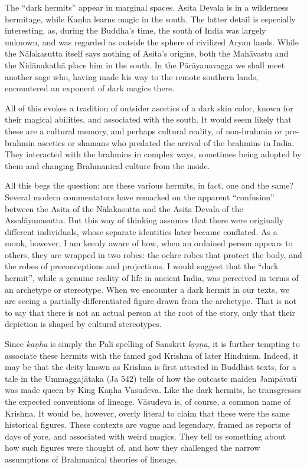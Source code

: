\documentclass[12pt,openany]{book}%
\begin{document}
The “dark hermits” appear in marginal spaces. Asita Devala is in a wilderness hermitage, while \textsanskrit{Kaṇha} learns magic in the south. The latter detail is especially interesting, as, during the Buddha’s time, the south of India was largely unknown, and was regarded as outside the sphere of civilized Aryan lands. While the \textsanskrit{Nālakasutta} itself says nothing of Asita’s origins, both the \textsanskrit{Mahāvastu} and the \textsanskrit{Nidānakathā} place him in the south. In the \textsanskrit{Pārāyanavagga} we shall meet another sage who, having made his way to the remote southern lands, encountered an exponent of dark magics there.

All of this evokes a tradition of outsider ascetics of a dark skin color, known for their magical abilities, and associated with the south. It would seem likely that these are a cultural memory, and perhaps cultural reality, of non-brahmin or pre-brahmin ascetics or shamans who predated the arrival of the brahmins in India. They interacted with the brahmins in complex ways, sometimes being adopted by them and changing Brahmanical culture from the inside.

All this begs the question: are these various hermits, in fact, one and the same? Several modern commentators have remarked on the apparent “confusion” between the Asita of the \textsanskrit{Nālakasutta} and the Asita Devala of the \textsanskrit{Assalāyanasutta}. But this way of thinking assumes that there were originally different individuals, whose separate identities later became conflated. As a monk, however, I am keenly aware of how, when an ordained person appears to others, they are wrapped in two robes: the ochre robes that protect the body, and the robes of preconceptions and projections. I would suggest that the “dark hermit”, while a genuine reality of life in ancient India, was perceived in terms of an archetype or stereotype. When we encounter a dark hermit in our texts, we are seeing a partially-differentiated figure drawn from the archetype. That is not to say that there is not an actual person at the root of the story, only that their depiction is shaped by cultural stereotypes.

Since \textit{\textsanskrit{kaṇha}} is simply the Pali spelling of Sanskrit \textit{\textsanskrit{kṛṣṇa}}, it is further tempting to associate these hermits with the famed god Krishna of later Hinduism. Indeed, it may be that the deity known as Krishna is first attested in Buddhist texts, for a tale in the \textsanskrit{Ummaggajātaka} (Ja 542) tells of how the outcaste maiden \textsanskrit{Jampāvatī} was made queen by King \textsanskrit{Kaṇha} \textsanskrit{Vāsudeva}. Like the dark hermits, he transgresses the expected conventions of lineage. \textsanskrit{Vāsudeva} is, of course, a common name of Krishna. It would be, however, overly literal to claim that these were the same historical figures. These contexts are vague and legendary, framed as reports of days of yore, and associated with weird magics. They tell us something about how such figures were thought of, and how they challenged the narrow assumptions of Brahmanical theories of lineage.
\end{document}
